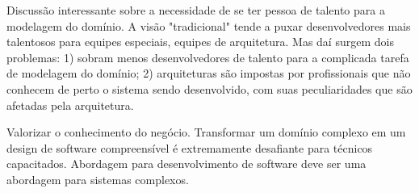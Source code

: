 \documentclass[a4paper, 12pt]{article}
\begin{document}
Discussão interessante sobre a necessidade de se ter pessoa de talento para a modelagem do domínio.
A visão "tradicional" tende a puxar desenvolvedores mais talentosos para equipes especiais, equipes de arquitetura. Mas daí surgem dois problemas: 1) sobram menos desenvolvedores de talento para a complicada tarefa de modelagem do domínio; 2) arquiteturas são impostas por profissionais que não conhecem de perto o sistema sendo desenvolvido, com suas peculiaridades que são afetadas pela arquitetura.

Valorizar o conhecimento do negócio.
Transformar  um domínio complexo em um design de software compreensível é extremamente desafiante para técnicos capacitados.
Abordagem para desenvolvimento de software deve ser uma abordagem para sistemas complexos.










  
\end{document}

